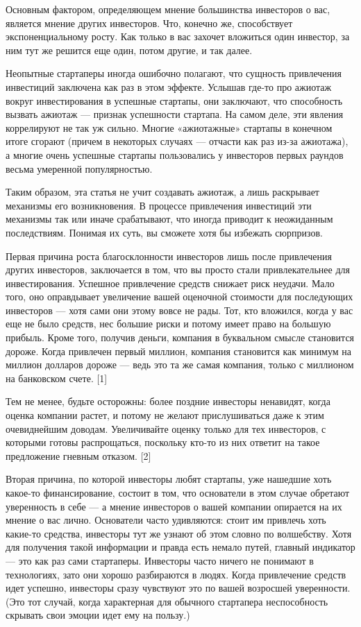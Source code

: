 \documentclass[ebook,12pt,oneside,openany]{memoir}
\begin{document}
\maketitle

Основным фактором, определяющем мнение большинства инвесторов о вас,
является мнение других инвесторов. Что, конечно же, способствует
экспоненциальному росту. Как только в вас захочет вложиться один
инвестор, за ним тут же решится еще один, потом другие, и так далее.

Неопытные стартаперы иногда ошибочно полагают, что сущность
привлечения инвестиций заключена как раз в этом эффекте. Услышав
где-то про ажиотаж вокруг инвестирования в успешные стартапы, они
заключают, что способность вызвать ажиотаж — признак успешности
стартапа. На самом деле, эти явления коррелируют не так уж сильно.
Многие «ажиотажные» стартапы в конечном итоге сгорают (причем в
некоторых случаях — отчасти как раз из-за ажиотажа), а многие очень
успешные стартапы пользовались у инвесторов первых раундов весьма
умеренной популярностью.

Таким образом, эта статья не учит создавать ажиотаж, а лишь раскрывает
механизмы его возникновения. В процессе привлечения инвестиций эти
механизмы так или иначе срабатывают, что иногда приводит к неожиданным
последствиям. Понимая их суть, вы сможете хотя бы избежать сюрпризов.

Первая причина роста благосклонности инвесторов лишь после привлечения
других инвесторов, заключается в том, что вы просто стали
привлекательнее для инвестирования. Успешное привлечение средств
снижает риск неудачи. Мало того, оно оправдывает увеличение вашей
оценочной стоимости для последующих инвесторов — хотя сами они этому
вовсе не рады. Тот, кто вложился, когда у вас еще не было средств, нес
большие риски и потому имеет право на большую прибыль. Кроме того,
получив деньги, компания в буквальном смысле становится дороже. Когда
привлечен первый миллион, компания становится как минимум на миллион
долларов дороже — ведь это та же самая компания, только с миллионом на
банковском счете. [1]

Тем не менее, будьте осторожны: более поздние инвесторы ненавидят,
когда оценка компании растет, и потому не желают прислушиваться даже к
этим очевиднейшим доводам. Увеличивайте оценку только для тех
инвесторов, с которыми готовы распрощаться, поскольку кто-то из них
ответит на такое предложение гневным отказом. [2]

Вторая причина, по которой инвесторы любят стартапы, уже нашедшие хоть
какое-то финансирование, состоит в том, что основатели в этом случае
обретают уверенность в себе — а мнение инвесторов о вашей компании
опирается на их мнение о вас лично. Основатели часто удивляются: стоит
им привлечь хоть какие-то средства, инвесторы тут же узнают об этом
словно по волшебству. Хотя для получения такой информации и правда
есть немало путей, главный индикатор — это как раз сами стартаперы.
Инвесторы часто ничего не понимают в технологиях, зато они хорошо
разбираются в людях. Когда привлечение средств идет успешно, инвесторы
сразу чувствуют это по вашей возросшей уверенности. (Это тот случай,
когда характерная для обычного стартапера неспособность скрывать свои
эмоции идет ему на пользу.)
\end{document}
